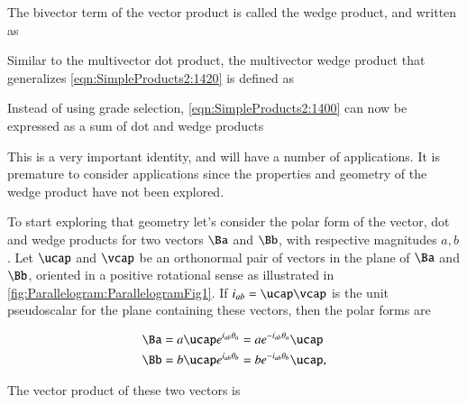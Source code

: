 The bivector term of the vector product is called the wedge product, and written as


Similar to the multivector dot product, the multivector wedge product that generalizes
\cref{eqn:SimpleProducts2:1420} is defined as


Instead of using grade selection, \cref{eqn:SimpleProducts2:1400} can now be expressed as a sum of dot and wedge products


This is a very important identity, and will have a number of applications.
It is premature to consider applications since
the properties and geometry of the wedge product have not been explored.

To start exploring that geometry let's consider the polar form of the vector, dot and wedge products for two vectors \( \Ba \) and \( \Bb \), with respective magnitudes \( a, b \).  
Let \( \ucap \) and \( \vcap \) be an orthonormal pair of vectors in the plane of \( \Ba \) and \( \Bb \), oriented in a positive rotational sense as illustrated in 
\cref{fig:Parallelogram:ParallelogramFig1}.
If \( i_{ab} = \ucap \vcap \) is the unit pseudoscalar for the plane containing these vectors, then the polar forms are

\begin{dmath}\label{eqn:SimpleProducts2:1660}
\begin{aligned}
\Ba &= a \ucap e^{ i_{ab} \theta_a } = a e^{ -i_{ab} \theta_a } \ucap \\
\Bb &= b \ucap e^{ i_{ab} \theta_b } = b e^{ -i_{ab} \theta_b } \ucap,
\end{aligned}
\end{dmath}

The vector product of these two vectors is

